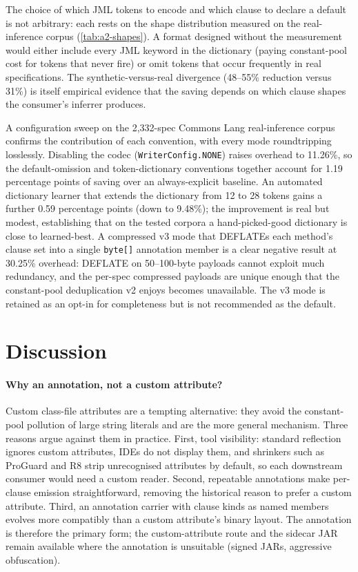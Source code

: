 The choice of which JML tokens to encode and which clause to declare a default is
not arbitrary: each rests on the shape distribution measured on the
real-inference corpus (\cref{tab:a2-shapes}). A format designed without the
measurement would either include every JML keyword in the dictionary (paying
constant-pool cost for tokens that never fire) or omit tokens that occur
frequently in real specifications. The synthetic-versus-real divergence
(48--55\% reduction versus 31\%) is itself empirical evidence that the saving
depends on which clause shapes the consumer's inferrer produces.

A configuration sweep on the 2{,}332-spec Commons Lang real-inference corpus
confirms the contribution of each convention, with every mode roundtripping
losslessly. Disabling the codec (\texttt{WriterConfig.NONE}) raises overhead to
11.26\%, so the default-omission and token-dictionary conventions together
account for 1.19 percentage points of saving over an always-explicit baseline.
An automated dictionary learner that extends the dictionary from 12 to 28 tokens
gains a further 0.59 percentage points (down to 9.48\%); the improvement is real
but modest, establishing that on the tested corpora a hand-picked-good dictionary
is close to learned-best. A compressed v3 mode that DEFLATEs each method's clause
set into a single \texttt{byte[]} annotation member is a clear negative result at
30.25\% overhead: DEFLATE on 50--100-byte payloads cannot exploit much
redundancy, and the per-spec compressed payloads are unique enough that the
constant-pool deduplication v2 enjoys becomes unavailable. The v3 mode is
retained as an opt-in for completeness but is not recommended as the default.

\section{Discussion}
\label{sec:a2-discussion}

\paragraph{Why an annotation, not a custom attribute?}
Custom class-file attributes are a tempting alternative: they avoid the
constant-pool pollution of large string literals and are the more general
mechanism. Three reasons argue against them in practice. First, tool visibility:
standard reflection ignores custom attributes, IDEs do not display them, and
shrinkers such as ProGuard and R8 strip unrecognised attributes by default, so
each downstream consumer would need a custom reader. Second, repeatable
annotations make per-clause emission straightforward, removing the historical
reason to prefer a custom attribute. Third, an annotation carrier with clause
kinds as named members evolves more compatibly than a custom attribute's binary
layout. The annotation is therefore the primary form; the custom-attribute route
and the sidecar JAR remain available where the annotation is unsuitable (signed
JARs, aggressive obfuscation).

